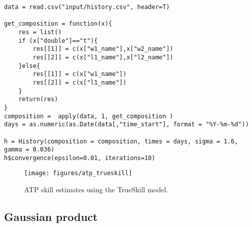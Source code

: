 \documentclass[article]{jss}
\begin{document}
\begin{lstlisting}[captionpos=b,backgroundcolor=\color{r!50},caption={The history of the Association of Tennis Professionals using \proglang{R}.}, belowskip=0cm]
data = read.csv("input/history.csv", header=T)

get_composition = function(x){
    res = list()
    if (x["double"]=="t"){
        res[[1]] = c(x["w1_name"],x["w2_name"])
        res[[2]] = c(x["l1_name"],x["l2_name"])
    }else{
        res[[1]] = c(x["w1_name"])
        res[[2]] = c(x["l1_name"])
    }
    return(res)
}
composition =  apply(data, 1, get_composition ) 
days = as.numeric(as.Date(data[,"time_start"], format = "%Y-%m-%d"))

h = History(composition = composition, times = days, sigma = 1.6, gamma = 0.036)
h$convergence(epsilon=0.01, iterations=10)
\end{lstlisting}

\begin{figure}[ht!]
 \centering
  \texttt{[image: figures/atp\_trueskill]}
  \caption{ATP skill estimates using the TrueSkill model.}
  \label{atp_trueskill}
\end{figure}


\subsection{Gaussian product}\label{multiplicacion_normales}
\end{document}
